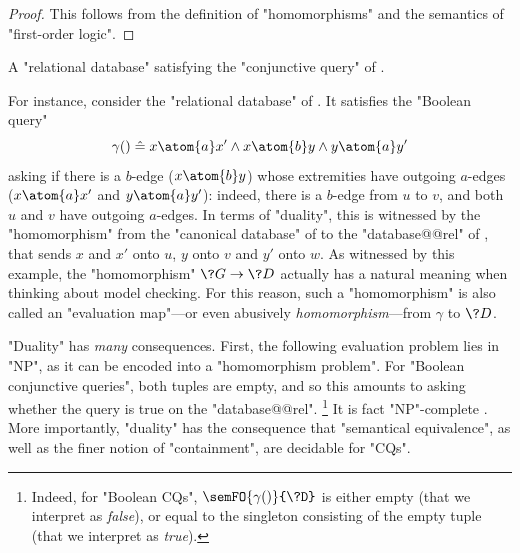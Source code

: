 \begin{proof}
	This follows from the definition of "homomorphisms" and
	the semantics of "first-order logic".
\end{proof}
\begin{marginfigure}
	\centering
	\caption{\AP\label{fig:prelim-db-stupid-ex}
		A "relational database" satisfying the "conjunctive query" of 
		.
	}
\end{marginfigure}
For instance, consider the "relational database" of .
It satisfies the "Boolean query" 
\[
	\gamma() \defeq x \atom{a} x' \land x \atom{b} y \land y \atom{a} y'
\]
asking if there is a $b$-edge ($x \atom{b} y$) whose extremities
have outgoing $a$-edges ($x \atom{a} x'$ and $y \atom{a} y'$):
indeed, there is a $b$-edge from $u$ to $v$, and both $u$ and $v$
have outgoing $a$-edges. In terms of "duality", this is
witnessed by the "homomorphism" from the
"canonical database" of  to the
"database@@rel" of ,
that sends $x$ and $x'$ onto $u$, $y$ onto $v$ and $y'$ onto $w$.
As witnessed by this example, the "homomorphism" $\?G \to \?D$ actually has a
natural meaning when thinking about model checking.
For this reason, such a "homomorphism" is also called an "evaluation map"---or even
abusively \emph{homomorphism}---from $\gamma$ to $\?D$.

"Duality" has \emph{many} consequences. First, the following evaluation problem
lies in "NP", as it can be encoded into a "homomorphism problem".
For "Boolean conjunctive queries", both tuples are empty, and so
this amounts to asking whether the query is true on the "database@@rel".%
\footnote{Indeed, for "Boolean CQs",
$\semFO{\gamma()}{\?D}$ is either empty (that we interpret as \emph{false}),
or equal to the singleton consisting of the empty tuple (that we interpret as \emph{true}).}
It is fact "NP"-complete \cite[Theorem 7]{ChandraMerlin1977Implementation}.
More importantly, "duality" has the consequence that
"semantical equivalence", as well as the finer notion of "containment",
are decidable for "CQs".


